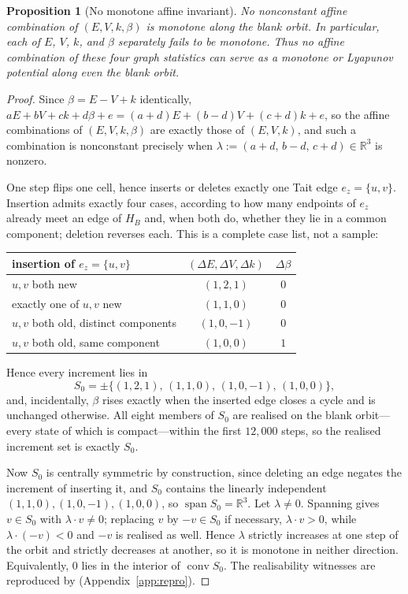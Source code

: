 \documentclass[11pt,letterpaper]{article}
\theoremstyle{plain}
\newtheorem{proposition}[theorem]{Proposition}
\theoremstyle{definition}
\begin{document}
\begin{NoHyper}
\begin{proposition}[No monotone affine invariant]\label{rem:nomonotone}
No nonconstant affine combination of $(E,V,k,\beta)$ is monotone along the blank
orbit. In particular, each of $E$, $V$, $k$, and $\beta$ separately fails to be
monotone. Thus no affine combination of these four graph statistics can serve as a
monotone or Lyapunov potential along even the blank orbit.
\end{proposition}

\begin{proof}
Since $\beta=E-V+k$ identically,
$aE+bV+ck+d\beta+e=(a+d)E+(b-d)V+(c+d)k+e$, so the affine combinations of
$(E,V,k,\beta)$ are exactly those of $(E,V,k)$, and such a combination is nonconstant
precisely when $\lambda:=(a+d,\,b-d,\,c+d)\in\mathbb{R}^3$ is nonzero.

One step flips one cell, hence inserts or deletes exactly one Tait edge
$e_z=\{u,v\}$. Insertion admits exactly four cases, according to how many endpoints of
$e_z$ already meet an edge of $H_B$ and, when both do, whether they lie in a common
component; deletion reverses each. This is a complete case list, not a sample:
\begin{center}
\begin{tabular}{@{}lcc@{}}
\toprule
insertion of $e_z=\{u,v\}$ & $(\Delta E,\Delta V,\Delta k)$ & $\Delta\beta$\\
\midrule
$u,v$ both new & $(1,2,1)$ & $0$\\
exactly one of $u,v$ new & $(1,1,0)$ & $0$\\
$u,v$ both old, distinct components & $(1,0,-1)$ & $0$\\
$u,v$ both old, same component & $(1,0,0)$ & $1$\\
\bottomrule
\end{tabular}
\end{center}
Hence every increment lies in
\begin{equation}\label{eq:evkdeltas}
S_0=\pm\bigl\{(1,2,1),\,(1,1,0),\,(1,0,-1),\,(1,0,0)\bigr\},
\end{equation}
and, incidentally, $\beta$ rises exactly when the inserted edge closes a cycle and is
unchanged otherwise. All eight members of $S_0$ are realised on the blank orbit---every
state of which is compact---within the first $12{,}000$ steps, so the realised
increment set is exactly $S_0$.

Now $S_0$ is centrally symmetric by construction, since deleting an edge negates the
increment of inserting it, and $S_0$ contains the linearly independent
$(1,1,0),(1,0,-1),(1,0,0)$, so $\operatorname{span}S_0=\mathbb{R}^3$. Let
$\lambda\neq0$. Spanning gives $v\in S_0$ with $\lambda\cdot v\neq0$; replacing $v$ by
$-v\in S_0$ if necessary, $\lambda\cdot v>0$, while $\lambda\cdot(-v)<0$ and $-v$ is
realised as well. Hence $\lambda$ strictly increases at one step of the orbit and
strictly decreases at another, so it is monotone in neither direction. Equivalently,
$0$ lies in the interior of $\operatorname{conv}S_0$. The realisability witnesses are
reproduced by  (Appendix~\ref{app:repro}).
\end{proof}


\end{NoHyper}
\end{document}
